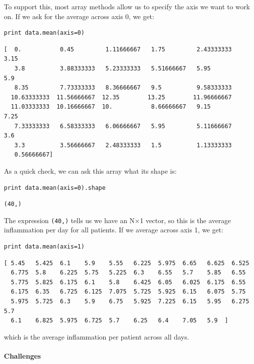 \documentclass{book}
\begin{document}
To support this, most array methods allow us to specify the axis we want
to work on. If we ask for the average across axis 0, we get:

\begin{verbatim}
print data.mean(axis=0)
\end{verbatim}

\begin{verbatim}
[  0.           0.45         1.11666667   1.75         2.43333333   3.15
   3.8          3.88333333   5.23333333   5.51666667   5.95         5.9
   8.35         7.73333333   8.36666667   9.5          9.58333333
  10.63333333  11.56666667  12.35        13.25        11.96666667
  11.03333333  10.16666667  10.           8.66666667   9.15         7.25
   7.33333333   6.58333333   6.06666667   5.95         5.11666667   3.6
   3.3          3.56666667   2.48333333   1.5          1.13333333
   0.56666667]
\end{verbatim}

As a quick check, we can ask this array what its shape is:

\begin{verbatim}
print data.mean(axis=0).shape
\end{verbatim}

\begin{verbatim}
(40,)
\end{verbatim}

The expression \texttt{(40,)} tells us we have an N×1 vector, so this is
the average inflammation per day for all patients. If we average across
axis 1, we get:

\begin{verbatim}
print data.mean(axis=1)
\end{verbatim}

\begin{verbatim}
[ 5.45   5.425  6.1    5.9    5.55   6.225  5.975  6.65   6.625  6.525
  6.775  5.8    6.225  5.75   5.225  6.3    6.55   5.7    5.85   6.55
  5.775  5.825  6.175  6.1    5.8    6.425  6.05   6.025  6.175  6.55
  6.175  6.35   6.725  6.125  7.075  5.725  5.925  6.15   6.075  5.75
  5.975  5.725  6.3    5.9    6.75   5.925  7.225  6.15   5.95   6.275  5.7
  6.1    6.825  5.975  6.725  5.7    6.25   6.4    7.05   5.9  ]
\end{verbatim}

which is the average inflammation per patient across all days.

\mbox{}\paragraph{Challenges}
\end{document}
